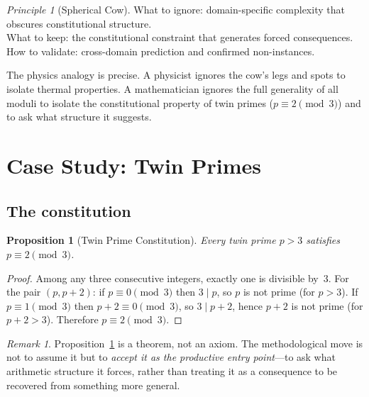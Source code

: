\documentclass[12pt]{amsart}
\theoremstyle{plain}
\newtheorem{proposition}[theorem]{Proposition}
\theoremstyle{definition}
\theoremstyle{remark}
\newtheorem{remark}[theorem]{Remark}
\newtheorem{principle}[theorem]{Principle}
\begin{document}
\begin{principle}[Spherical Cow]
\label{prin:sc}
What to ignore: domain-specific complexity that obscures constitutional
structure.\\
What to keep: the constitutional constraint that generates forced consequences.\\
How to validate: cross-domain prediction and confirmed non-instances.
\end{principle}

The physics analogy is precise. A physicist ignores the cow's legs and spots
to isolate thermal properties. A mathematician ignores the full generality of
all moduli to isolate the constitutional property of twin primes ($p \equiv 2
\pmod{3}$) and to ask what structure it suggests.

\section{Case Study: Twin Primes}

\subsection{The constitution}
\label{sec:constitution}

\begin{proposition}[Twin Prime Constitution]
\label{prop:constitution}
Every twin prime $p > 3$ satisfies $p \equiv 2 \pmod{3}$.
\end{proposition}

\begin{proof}
Among any three consecutive integers, exactly one is divisible by~$3$.
For the pair $(p, p+2)$: if $p \equiv 0 \pmod{3}$ then $3 \mid p$, so $p$
is not prime (for $p > 3$). If $p \equiv 1 \pmod{3}$ then $p + 2 \equiv 0
\pmod{3}$, so $3 \mid p+2$, hence $p+2$ is not prime (for $p+2 > 3$). Therefore
$p \equiv 2 \pmod{3}$.
\end{proof}

\begin{remark}
Proposition~\ref{prop:constitution} is a theorem, not an axiom. The
methodological move is not to assume it but to \emph{accept it as the productive
entry point}---to ask what arithmetic structure it forces, rather than treating
it as a consequence to be recovered from something more general.
\end{remark}
\end{document}
